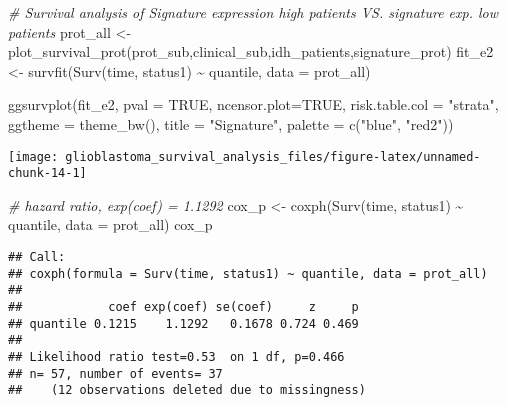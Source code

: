 \documentclass[
]{article}
\newenvironment{Shaded}{\begin{snugshade}}{\end{snugshade}}
\newcommand{\AttributeTok}[1]{\textcolor[rgb]{0.77,0.63,0.00}{#1}}
\newcommand{\CommentTok}[1]{\textcolor[rgb]{0.56,0.35,0.01}{\textit{#1}}}
\newcommand{\ConstantTok}[1]{\textcolor[rgb]{0.00,0.00,0.00}{#1}}
\newcommand{\FunctionTok}[1]{\textcolor[rgb]{0.00,0.00,0.00}{#1}}
\newcommand{\NormalTok}[1]{#1}
\newcommand{\OtherTok}[1]{\textcolor[rgb]{0.56,0.35,0.01}{#1}}
\newcommand{\SpecialCharTok}[1]{\textcolor[rgb]{0.00,0.00,0.00}{#1}}
\newcommand{\StringTok}[1]{\textcolor[rgb]{0.31,0.60,0.02}{#1}}
\begin{document}
\begin{Shaded}
\begin{Highlighting}[]
\CommentTok{\# Survival analysis of Signature expression high patients VS. signature exp. low patients}
\NormalTok{prot\_all }\OtherTok{\textless{}{-}} \FunctionTok{plot\_survival\_prot}\NormalTok{(prot\_sub,clinical\_sub,idh\_patients,signature\_prot)}
\NormalTok{fit\_e2 }\OtherTok{\textless{}{-}} \FunctionTok{survfit}\NormalTok{(}\FunctionTok{Surv}\NormalTok{(time, status1) }\SpecialCharTok{\textasciitilde{}}\NormalTok{ quantile, }\AttributeTok{data =}\NormalTok{ prot\_all)}

\FunctionTok{ggsurvplot}\NormalTok{(fit\_e2,}
           \AttributeTok{pval =} \ConstantTok{TRUE}\NormalTok{,}
           \AttributeTok{ncensor.plot=}\ConstantTok{TRUE}\NormalTok{,}
           \AttributeTok{risk.table.col =} \StringTok{"strata"}\NormalTok{, }
           \AttributeTok{ggtheme =} \FunctionTok{theme\_bw}\NormalTok{(), }
           \AttributeTok{title =} \StringTok{"Signature"}\NormalTok{,}
           \AttributeTok{palette =} \FunctionTok{c}\NormalTok{(}\StringTok{"blue"}\NormalTok{, }\StringTok{"red2"}\NormalTok{))}
\end{Highlighting}
\end{Shaded}

\begin{center}\texttt{[image: glioblastoma\_survival\_analysis\_files/figure-latex/unnamed-chunk-14-1]} \end{center}

\begin{Shaded}
\begin{Highlighting}[]
\CommentTok{\# hazard ratio, exp(coef) = 1.1292}
\NormalTok{cox\_p }\OtherTok{\textless{}{-}} \FunctionTok{coxph}\NormalTok{(}\FunctionTok{Surv}\NormalTok{(time, status1) }\SpecialCharTok{\textasciitilde{}}\NormalTok{ quantile, }\AttributeTok{data =}\NormalTok{ prot\_all)}
\NormalTok{cox\_p}
\end{Highlighting}
\end{Shaded}

\begin{verbatim}
## Call:
## coxph(formula = Surv(time, status1) ~ quantile, data = prot_all)
## 
##            coef exp(coef) se(coef)     z     p
## quantile 0.1215    1.1292   0.1678 0.724 0.469
## 
## Likelihood ratio test=0.53  on 1 df, p=0.466
## n= 57, number of events= 37 
##    (12 observations deleted due to missingness)
\end{verbatim}
\end{document}
